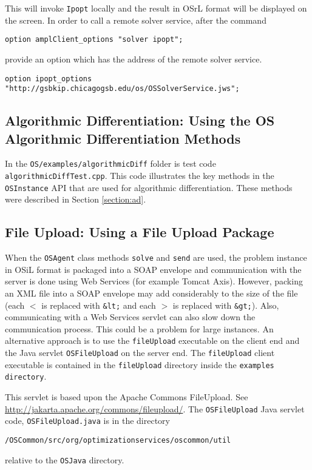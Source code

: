 \documentclass[11pt]{article}
\renewcommand{\_}{{\char"5F}}
\renewcommand{\{}{{\char"7B}}
\renewcommand{\}}{{\char"7D}}
\renewcommand{\^}{{\char"0D}}
\renewcommand{\'}{{\char"0D}}
\begin{document}
This will invoke {\tt Ipopt} locally and the result in OSrL format will be displayed on the screen. In order to call a remote solver service, after the command
\begin{verbatim}
option amplClient_options "solver ipopt";
\end{verbatim}
provide an option which has the address of the remote solver service.
\begin{verbatim}
option ipopt_options "http://gsbkip.chicagogsb.edu/os/OSSolverService.jws";
\end{verbatim}

\subsection{Algorithmic Differentiation:  Using the OS Algorithmic Differentiation Methods}\label{section:cppad}

In the {\tt OS/examples/algorithmicDiff} folder is test code {\tt algorithmicDiffTest.cpp}. This code illustrates the key methods in the {\tt OSInstance} API that are used for algorithmic differentiation.   These methods were described in Section \ref{section:ad}.



\subsection{File Upload:  Using a File Upload Package}\label{section:fileupload}



When the {\tt OSAgent}  class methods {\tt solve} and {\tt send} are used, the problem instance in OSiL format is packaged into a SOAP envelope and communication with the server is done using Web Services (for example Tomcat Axis). However, packing an XML file into a SOAP envelope may add considerably to the size of the file (each {\tt $<$} is replaced with {\tt \&lt;}  and each {\tt $>$} is replaced with {\tt \&gt;}). Also, communicating with a Web Services servlet can also slow down the communication process. This could be a problem for large instances. An alternative approach is to use the {\tt fileUpload} executable on the client end  and the Java servlet {\tt OSFileUpload} on the server end.  The {\tt fileUpload} client executable is contained in the {\tt fileUpload}  directory inside the {\tt examples directory}.

This servlet is based upon the Apache Commons FileUpload. See \url{http://jakarta.apache.org/commons/fileupload/}. The {\tt OSFileUpload} Java servlet code, {\tt OSFileUpload.java} is in the directory
\begin{verbatim}
/OSCommon/src/org/optimizationservices/oscommon/util
\end{verbatim}
relative to the {\tt OSJava} directory.
\end{document}
